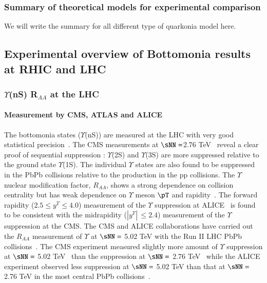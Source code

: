 \documentclass[review]{elsarticle}
\begin{document}
{\subsubsection{Summary of theoretical models for experimental comparison}

{\color{red} We will write the summary for all different type of quarkonia model here.}


\subsection{Experimental overview of Bottomonia results at RHIC and LHC}


\subsubsection{$\Upsilon$(nS) R$_{AA}$ at the LHC}

\paragraph{Measurement by CMS, ATLAS and ALICE}

The bottomonia states ($\Upsilon$(nS)) are measured at the LHC with very good statistical
precision~\cite{Chatrchyan:2011pe,Chatrchyan:2012lxa,Abelev:2014nua,Khachatryan:2016xxp}.
The CMS measurements at $\sNN =$2.76 TeV~\cite{Chatrchyan:2011pe,Chatrchyan:2012lxa} reveal
a clear proof of sequential suppression :  $\Upsilon$(2S) and $\Upsilon$(3S) are 
more suppressed relative to the ground state $\Upsilon$(1S).   The individual $\Upsilon$ states are also found to be suppressed in
the PbPb collisions relative to the production in the pp collisions. The $\Upsilon$ nuclear
modification factor, $R_{AA}$, shows a strong dependence on collision centrality but has
weak dependence on $\Upsilon$ meson $\pT$ and rapidity~\cite{Khachatryan:2016xxp}.
The forward rapidity ($2.5 \leq y^{\Upsilon} \leq 4.0$) measurement of the $\Upsilon$ suppression at 
ALICE~\cite{Abelev:2014nua} is found to be consistent with the midrapidity ($|y^{\Upsilon}|\,\leq 2.4$)
measurement of the $\Upsilon$ suppression at the CMS. 
The CMS and ALICE collaborations have carried out the $R_{AA}$ measurement of $\Upsilon$
at $\sNN =$ 5.02 TeV with the Run II LHC PbPb
collisions~\cite{Sirunyan:2017lzi,Sirunyan:2018nsz,ALICE:Y5TeV}.
The CMS experiment measured slightly more amount of $\Upsilon$ suppression at
$\sNN =$ 5.02 TeV~\cite{Sirunyan:2017lzi,Sirunyan:2018nsz} than the suppression at
$\sNN =$ 2.76 TeV~\cite{Khachatryan:2016xxp} while the ALICE experiment observed less
suppression at $\sNN =$ 5.02 TeV than that at $\sNN =$ 2.76 TeV 
in the most central PbPb collisions~\cite{Abelev:2014nua,ALICE:Y5TeV}.





}
\end{document}
